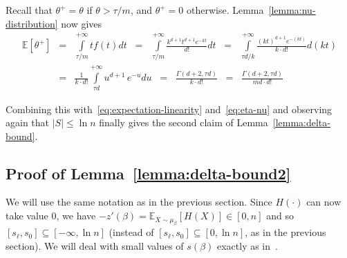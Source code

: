 \documentclass[final,12pt]{colt2018}
\def\E{{\mathbb E}}
\begin{document}

Recall that $\theta^+=\theta$ if $\theta>\tau/m$, and $\theta^+=0$ otherwise.
Lemma~\ref{lemma:nu-distribution} now gives
\begin{eqnarray*}
\E[\theta^+]
&=& \int\limits_{\tau/m}^{+\infty} tf(t)dt 
\;\;=\;\; \int\limits_{\tau/m}^{+\infty} \frac{k^{d+1}t^{d+1}e^{-kt}}{ d!}dt 
\;\;=\;\; \int\limits_{\tau d/k}^{+\infty} \frac{(kt)^{d+1}e^{-(kt)}}{k\cdot d!}d(kt) \\
&=&\frac{1}{k\cdot d!}\int\limits_{\tau d}^{+\infty} u^{d+1}\, e^{-u} du
\;\;=\;\;\frac{\Gamma(d+2,\tau d)}{k\cdot d!}
\;\;=\;\;\frac{\Gamma(d+2,\tau d)}{md\cdot d!}
\end{eqnarray*}

Combining this with~\eqref{eq:expectation-linearity} and~\eqref{eq:eta-nu} and observing again that $|S|\le \ln n$ finally gives the second claim of Lemma~\ref{lemma:delta-bound}.


\subsection{Proof of Lemma~\ref{lemma:delta-bound2}}\label{sec:lemma:delta-bound:proof2}
We will use the same notation as in the previous section.
Since  $H(\cdot)$ can now take value $0$, we have $-z'(\beta)=\E_{X\sim\mu_\beta}[H(X)]\in[0,n]$
and so $[s_\ell,s_0]\subseteq[-\infty,\ln n]$ (instead of $[s_\ell,s_0]\subseteq[0,\ln n]$, as in the previous section).
We will deal with small values of $s(\beta)$ exactly as in~\citep{Huber:Gibbs}.
\end{document}
